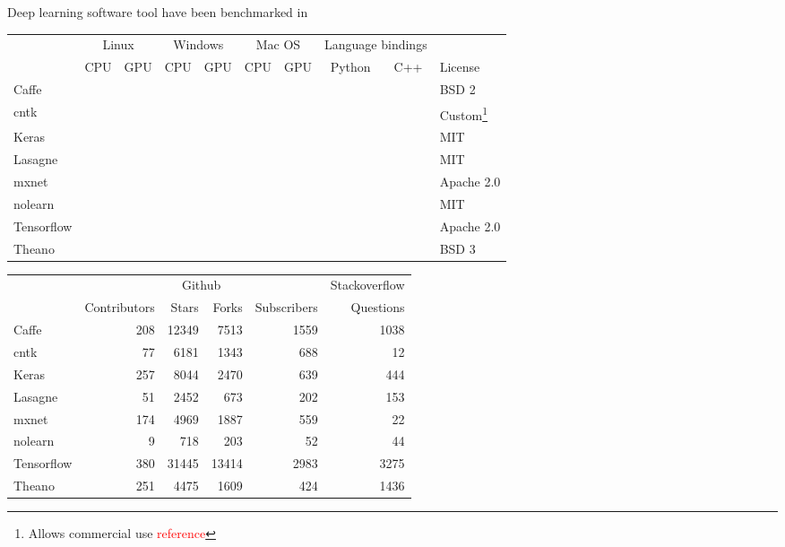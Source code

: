 \documentclass[a4paper, 11pt, table]{article}
\newcommand{\cmark}{\ding{51}}%
\newcommand{\xmark}{\ding{55}}%
\newcommand{\ymark}{\textcolor{clyes}{\cmark}}%
\newcommand{\nmark}{\textcolor{clno}{\xmark}}%
\begin{document}
Deep learning software tool have been benchmarked in~\cite{benchmarking_dl_tools}

\begin{landscape}
\begin{center}
\begin{tabular}{lccccccccl}
\hline 
 & \multicolumn{2}{c}{\cellcolor{linux}Linux} & \multicolumn{2}{c}{\cellcolor{windows}Windows} & \multicolumn{2}{c}{\cellcolor{macos}Mac OS} & \multicolumn{2}{c}{Language bindings} &  \\ 
 & \cellcolor{linux}CPU & \cellcolor{linux}GPU & \cellcolor{windows}CPU & \cellcolor{windows}GPU & \cellcolor{macos}CPU & \cellcolor{macos}GPU & Python & C++ & License\\ 
\hline 
Caffe & \ymark & \ymark & \ymark & \ymark & \ymark & \ymark & \ymark & \nmark & BSD 2\\ 
cntk & \ymark & \ymark & \ymark & \ymark & \nmark & \nmark & \ymark & \ymark & Custom\footnote{Allows commercial use \textcolor{red}{reference}} \\ 
Keras & \ymark & \ymark & \nmark & \nmark & \ymark & \nmark & \ymark & \nmark & MIT \\ 
Lasagne & \ymark & \ymark & \ymark & \ymark & \ymark & \ymark & \ymark & \nmark & MIT \\ 
mxnet & \ymark & \ymark & \ymark & \ymark & \ymark & \ymark & \ymark & \ymark & Apache 2.0 \\ 
nolearn & \ymark & \ymark & \ymark & \ymark & \ymark & \ymark & \ymark & \nmark & MIT \\ 
Tensorflow & \ymark & \ymark & \nmark & \nmark & \ymark & \nmark & \ymark & \ymark & Apache 2.0 \\ 
Theano & \ymark & \ymark & \ymark & \ymark & \ymark & \ymark & \ymark & \nmark & BSD 3\\ 
\end{tabular} 
\end{center}

\begin{center}
\begin{tabular}{lrrrrr}
\hline 
 & \multicolumn{4}{c}{Github} & Stackoverflow \\ 
 & Contributors & Stars & Forks & Subscribers & Questions \\ 
\hline 
Caffe & 208 & 12349 & 7513 & 1559 & 1038 \\ 
cntk & 77 & 6181 & 1343 & 688 & 12 \\ 
Keras & 257 & 8044 & 2470 & 639 & 444 \\ 
Lasagne & 51 & 2452 & 673 & 202 & 153 \\ 
mxnet & 174 & 4969 & 1887 & 559 & 22 \\ 
nolearn & 9 & 718 & 203 & 52 & 44 \\ 
Tensorflow & 380 & 31445 & 13414 & 2983 & 3275 \\ 
Theano & 251 & 4475 & 1609 & 424 & 1436 \\ 
\end{tabular} 
\end{center}




\end{landscape}
\end{document}
